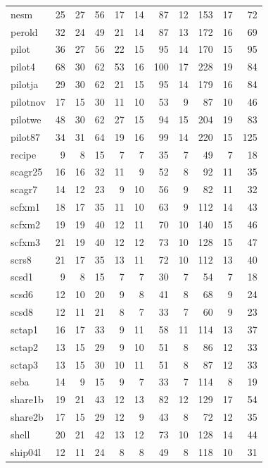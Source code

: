 \begin{small}
\begin{longtable}{|l|r|rr||r|rr||rr||rr|}
nesm & 25 & 27 & 56  & 17 & 14 & 87 & 12 & 153 & 17 & 72 \\
perold & 32 & 24 & 49  & 21 & 14 & 87 & 13 & 172 & 16 & 69 \\
pilot & 36 & 27 & 56  & 22 & 15 & 95 & 14 & 170 & 15 & 95 \\
pilot4 & 68 & 30 & 62  & 53 & 16 & 100 & 17 & 228 & 19 & 84 \\
pilotja & 29 & 30 & 62  & 21 & 15 & 95 & 14 & 179 & 16 & 84 \\
pilotnov & 17 & 15 & 30 & 11 & 10 & 53 & 9 & 87 & 10 & 46 \\
pilotwe & 48 & 30 & 62 & 27 & 15 & 94 & 15 & 204 & 19 & 83 \\
pilot87 & 34 & 31 & 64 & 19 & 16 & 99 & 14 & 220 & 15 & 125 \\
recipe & 9 & 8 & 15  & 7 & 7 & 35 & 7 & 49 & 7 & 18 \\
scagr25 & 16 & 16 & 32  & 11 & 9 & 52 & 8 & 92 & 11 & 35 \\
scagr7   & 14 & 12 & 23  & 9 & 10 & 56 & 9 & 82 & 11 & 32 \\
scfxm1   & 18 & 17 & 35  & 11 & 10 & 63 & 9 & 112 & 14 & 43 \\
scfxm2   & 19 & 19 & 40  & 12 & 11 & 70 & 10 & 140 & 15 & 46 \\
scfxm3   & 21 & 19 & 40  & 12 & 12 & 73 & 10 & 128 & 15 & 47 \\
scrs8    & 21 & 17 & 35  & 13 & 11 & 72 & 10 & 112 & 13 & 40 \\
scsd1    &  9 &  8 & 15  & 7 & 7 & 30 & 7 & 54 & 7 & 18 \\
scsd6    & 12 & 10 & 20  & 9 & 8 & 41 & 8 & 68 & 9 & 24 \\
scsd8    & 12 & 11 & 21  & 8 & 7 & 33 & 7 & 60 & 9 & 23 \\
sctap1   & 16 & 17 & 33  & 9 & 11 & 58 & 11 & 114 & 13 & 37 \\
sctap2   & 13 & 15 & 29  & 9 & 10 & 51 & 8 & 86 & 12 & 33 \\
sctap3   & 13 & 15 & 30  & 10 & 11 & 51 & 8 & 87 & 12 & 33 \\
seba     & 14 &  9 & 15  & 9 & 7 & 33 & 7 & 114 & 8 & 19 \\
share1b  & 19 & 21 & 43  & 12 & 13 & 82 & 12 & 129 & 17 & 54 \\
share2b  & 17 & 15 & 29  & 12 & 9 & 43 & 8 & 72 & 12 & 35 \\
shell    & 20 & 21 & 42  & 13 & 12 & 73 & 10 & 128 & 14 & 44 \\
ship04l  & 12 & 11 & 24  & 8 & 8 & 49 & 8 & 118 & 10 & 31 \\

\end{longtable}
\end{small}
